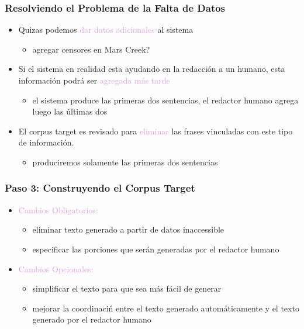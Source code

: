 \documentclass[compress,color=usenames]{beamer}
\newcommand{\mH}[1]{\textcolor{Plum}{#1}}
\begin{document}
\begin{frame}
\frametitle{Resolviendo el Problema de la Falta de Datos}

\begin{itemize}
\item Quizas podemos \mH{dar datos adicionales} al sistema 
    \begin{itemize}
        \item agregar censores en Mars Creek?
    \end{itemize}
\item Si el sistema en realidad esta ayudando en la redacci\'on a un humano, esta informaci\'on podr\'a ser \mH{agregada m\'as tarde}
    \begin{itemize}
    \item el sistema produce las primeras dos sentencias, el redactor humano agrega luego las \'ultimas dos     \end{itemize}
\item El corpus target es revisado para \mH{eliminar} las frases vinculadas con este tipo de informaci\'on.
    \begin{itemize}
    \item produciremos solamente las primeras dos sentencias
    \end{itemize}
\end{itemize}

\end{frame}

\begin{frame}
\frametitle{Paso 3: Construyendo el Corpus Target}

\begin{itemize}
\item { \mH{Cambios Obligatorios:}}
\begin{itemize}
\item { {eliminar texto generado a partir de datos inaccessible}}
\item { {especificar las porciones que ser\'an generadas por el redactor humano}}
\end{itemize}
\item { \mH{Cambios Opcionales:}}
\begin{itemize}
\item { {simplificar el texto para que sea m\'as f\'acil de generar}}
\item { {mejorar la coordinaci\'n entre el texto generado autom\'aticamente y el texto generado por el redactor humano}}
\end{itemize}
\end{itemize}

\end{frame}
\end{document}
